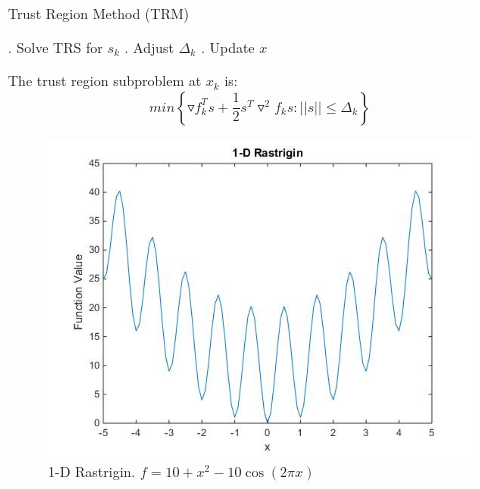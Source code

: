 \documentclass[hyperref={pdfpagelabels=false}]{beamer}
\begin{document}

\begin{frame}
\begin{algorithm} [H]
\caption{Trust Region Method (TRM)}
\begin{algorithmic} 
. Solve TRS for $s_k$
. Adjust $\Delta_k$
. Update $x$
\end{algorithmic}
\end{algorithm}
 The trust region subproblem at $x_k$ is:
\begin{equation}
min\left\lbrace \triangledown f_k^Ts+\frac{1}{2}s^T\triangledown^2f_ks: ||s||\leq \Delta_k\right\rbrace
\end{equation}
\end{frame}


\begin{frame}
\begin{figure}
\includegraphics[scale=0.4]{1DRast.jpg}
\caption{1-D Rastrigin. $f=10+x^2-10\cos(2\pi x)$}
\end{figure}
\end{frame}

\end{document}
